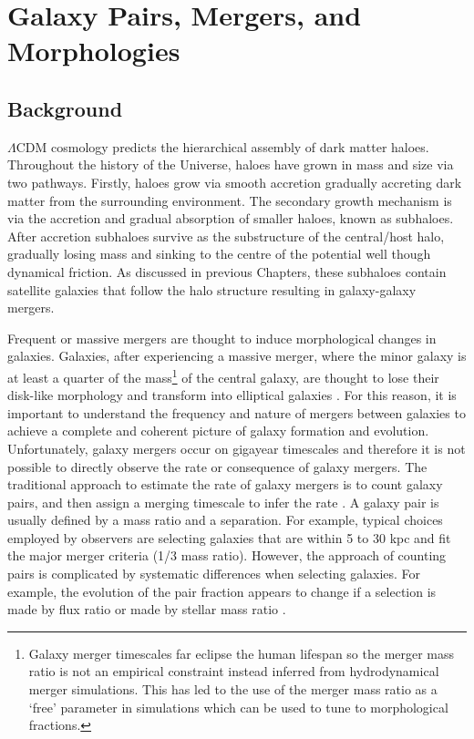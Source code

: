 
\chapter{Galaxy Pairs, Mergers, and Morphologies} 
\label{Chapter:GalPairs}

\section{Background}

$\Lambda$CDM cosmology predicts the hierarchical assembly of dark matter haloes.
Throughout the history of the Universe, haloes have grown in mass and size via two pathways. 
Firstly, haloes grow via smooth accretion gradually accreting dark matter from the surrounding environment. 
The secondary growth mechanism is via the accretion and gradual absorption of smaller haloes, known as subhaloes. 
After accretion subhaloes survive as the substructure of the central/host halo, gradually losing mass and sinking to the centre of the potential well though dynamical friction. As discussed in previous Chapters, these subhaloes contain satellite galaxies that follow the halo structure resulting in galaxy-galaxy mergers.

Frequent or massive mergers are thought to induce morphological changes in galaxies. 
Galaxies, after experiencing a massive merger, where the minor galaxy is at least a quarter of the mass\footnote{Galaxy merger timescales far eclipse the human lifespan so the merger mass ratio is not an empirical constraint instead inferred from hydrodynamical merger simulations. This has led to the use of the merger mass ratio as a `free' parameter in simulations which can be used to tune to morphological fractions.} of the central galaxy, are thought to lose their disk-like morphology and transform into elliptical galaxies \citep{Negroponte1983SimulationsGalaxies, DeLucia2006TheGalaxies}. 
For this reason, it is important to understand the frequency and nature of mergers between galaxies to achieve a complete and coherent picture of galaxy formation and evolution. 
Unfortunately, galaxy mergers occur on gigayear timescales and therefore it is not possible to directly observe the rate or consequence of galaxy mergers. 
The traditional approach to estimate the rate of galaxy mergers is to count galaxy pairs, and then assign a merging timescale to infer the rate \citep{Conselice20033,Conselice2008TheField,Mundy2017A3.5,Duncan2019ObservationalFields}.
A galaxy pair is usually defined by a mass ratio and a separation. For example, typical choices employed by observers are selecting galaxies that are within 5 to 30 kpc and fit the major merger criteria (1/3 mass ratio).
However, the approach of counting pairs is complicated by systematic differences when selecting galaxies. For example, the evolution of the pair fraction appears to change if a selection is made by flux ratio or made by stellar mass ratio \citep{Man2016RESOLVING03}.

